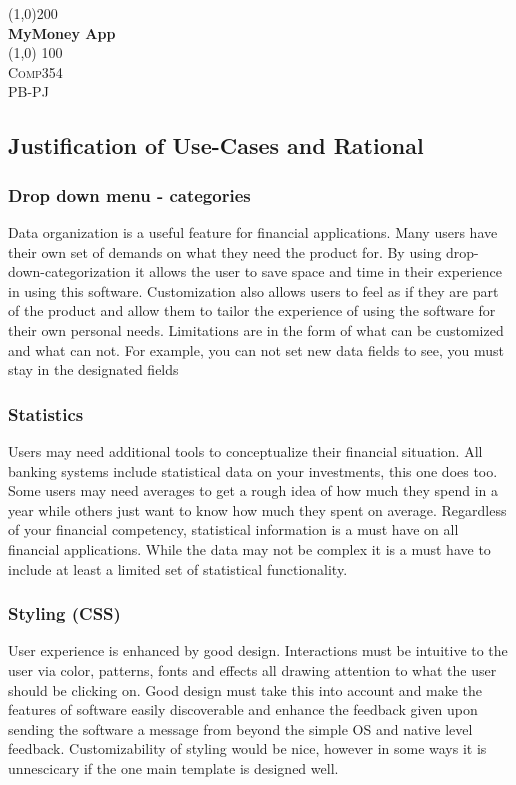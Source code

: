 \documentclass{article}
\begin{document}
\begin {titlepage}
    \begin{center}
   \line(1,0){200} \\
    \huge{\bfseries MyMoney App}\\
    \line (1,0) {100} \\
    [1.5cm]
    \textsc{\LARGE Comp354}\\
    [1cm]
    \textsc{\large PB-PJ}\\
    [3 cm]

    \end{center}
\end{titlepage}

\fontsize{11pt}{13pt}\selectfont
\setlength{\parindent}{13 pt}

\subsection{Justification of Use-Cases and Rational}
\subsubsection{Drop down menu - categories}
	Data organization is a useful feature for financial applications. Many users have their own set of demands on what they need the product for. By using drop-down-categorization it allows the user to save space and time in their experience in using this software. Customization also allows users to feel as if they are part of the product and allow them to tailor the experience of using the software for their own personal needs. Limitations are in the form of what can be customized and what can not. For example, you can not set new data fields to see, you must stay in the designated fields
\subsubsection{Statistics}
	Users may need additional tools to conceptualize their financial situation. All banking systems include statistical data on your investments, this one does too. Some users may need averages to get a rough idea of how much they spend in a year while others just want to know how much they spent on average. Regardless of your financial competency, statistical information is a must have on all financial applications. While the data may not be complex it is a must have to include at least a limited set of statistical functionality.
\subsubsection{Styling (CSS)}
	User experience is enhanced by good design. Interactions must be intuitive to the user via color, patterns, fonts and effects all drawing attention to what the user should be clicking on. Good design must take this into account and make the features of software easily discoverable and enhance the feedback given upon sending the software a message from beyond the simple OS and native level feedback. Customizability of styling would be nice, however in some ways it is unnescicary if the one main template is designed well.
\end{document}
